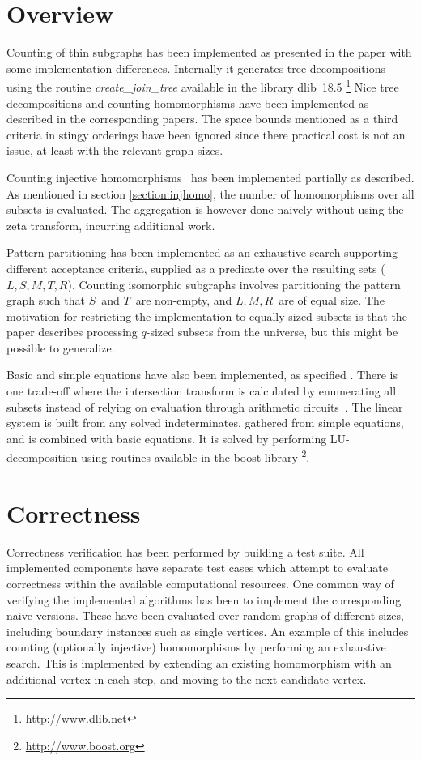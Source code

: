 \documentclass[a4paper,11pt]{report}
\theoremstyle{plain}
\theoremstyle{definition}
\begin{document}
\section{Overview}
Counting of thin subgraphs has been implemented as presented in the paper \cite{BHKK13} with some implementation differences.
Internally it generates tree decompositions using the routine \emph{create\_join\_tree} available in the library dlib 18.5 \footnote{\url{http://www.dlib.net}}
Nice tree decompositions \cite{kintali12} and counting homomorphisms \cite{DST02} have been implemented as described in the corresponding papers.
The space bounds mentioned as a third criteria in stingy orderings have been ignored since there practical cost is not an issue, at least with the relevant graph sizes.

Counting injective homomorphisms \cite{FLRRS12} has been implemented partially as described.
As mentioned in section \ref{section:injhomo}, the number of homomorphisms over all subsets is evaluated.
The aggregation is however done naively without using the zeta transform, incurring additional work.

Pattern partitioning has been implemented as an exhaustive search supporting different acceptance criteria, supplied as a predicate over the resulting sets ($L, S, M, T, R$).
Counting isomorphic subgraphs involves partitioning the pattern graph such that $S$ and $T$ are non-empty, and $L, M, R$ are of equal size.
The motivation for restricting the implementation to equally sized subsets is that the paper describes processing $q$-sized subsets from the universe, but this might be possible to generalize.

Basic and simple equations have also been implemented, as specified \cite{BHKK13}.
There is one trade-off where the intersection transform is calculated by enumerating all subsets instead of relying on evaluation through arithmetic circuits~\cite{BHKK08}.
The linear system is built from any solved indeterminates, gathered from simple equations, and is combined with basic equations.
It is solved by performing LU-decomposition using routines available in the boost library \footnote{\url{http://www.boost.org}}.

\section{Correctness}
Correctness verification has been performed by building a test suite.
All implemented components have separate test cases which attempt to evaluate correctness within the available computational resources.
One common way of verifying the implemented algorithms has been to implement the corresponding naive versions.
These have been evaluated over random graphs of different sizes, including boundary instances such as single vertices.
An example of this includes counting (optionally injective) homomorphisms by performing an exhaustive search.
This is implemented by extending an existing homomorphism with an additional vertex in each step, and moving to the next candidate vertex.
\end{document}
